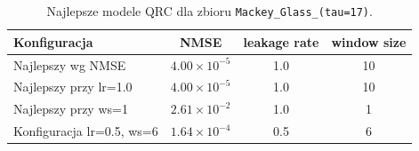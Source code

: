 \begin{table}[ht]
\centering
\caption{Najlepsze modele QRC dla zbioru \texttt{Mackey\_Glass\_(tau=17)}.}
\label{tab:qrc-mackey_glass__tau_17}
\begin{tabular}{lccc}
\toprule
Konfiguracja & NMSE & leakage rate & window size \\
\midrule
Najlepszy wg NMSE & $4.00 \times 10^{-5}$ & 1.0 & 10 \\
Najlepszy przy lr=1.0 & $4.00 \times 10^{-5}$ & 1.0 & 10 \\
Najlepszy przy ws=1 & $2.61 \times 10^{-2}$ & 1.0 & 1 \\
Konfiguracja lr=0.5, ws=6 & $1.64 \times 10^{-4}$ & 0.5 & 6 \\
\bottomrule
\end{tabular}
\end{table}